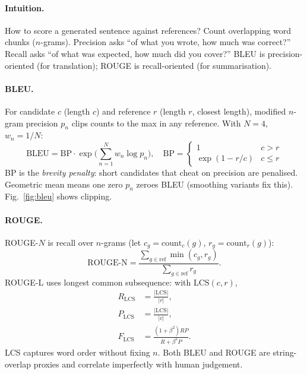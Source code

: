 \paragraph{Intuition.} How to score a generated sentence against references? Count overlapping word chunks ($n$-grams). Precision asks ``of what you wrote, how much was correct?'' Recall asks ``of what was expected, how much did you cover?'' BLEU is precision-oriented (for translation); ROUGE is recall-oriented (for summarisation).

\paragraph{BLEU.} For candidate $c$ (length $c$) and reference $r$ (length $r$, closest length), modified $n$-gram precision $p_n$ clips counts to the max in any reference. With $N=4$, $w_n=1/N$:
\begin{equation}
\text{BLEU}= \text{BP}\cdot\exp\!\Big(\sum_{n=1}^{N} w_n \log p_n\Big),\quad
\text{BP}=\begin{cases}1 & c>r\\ \exp(1-r/c) & c\le r\end{cases}
\label{eq:bleu}
\end{equation}
BP is the \emph{brevity penalty}: short candidates that cheat on precision are penalised. Geometric mean means one zero $p_n$ zeroes BLEU (smoothing variants fix this). Fig.~\ref{fig:bleu} shows clipping.

\paragraph{ROUGE.} ROUGE-$N$ is recall over $n$-grams (let $c_g{=}\text{count}_c(g)$, $r_g{=}\text{count}_r(g)$):
\begin{equation}
\text{ROUGE-N}=\frac{\sum_{g\in\text{ref}}\min(c_g,r_g)}{\sum_{g\in\text{ref}} r_g}.
\end{equation}
ROUGE-L uses longest common subsequence: with $\text{LCS}(c,r)$,
\begin{align}
R_{\text{LCS}}&=\frac{|\text{LCS}|}{|r|},\\
P_{\text{LCS}}&=\frac{|\text{LCS}|}{|c|},\\
F_{\text{LCS}}&=\frac{(1+\beta^2)RP}{R+\beta^2 P}.
\end{align}
LCS captures word order without fixing $n$. Both BLEU and ROUGE are string-overlap proxies and correlate imperfectly with human judgement.

